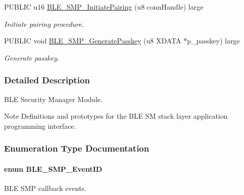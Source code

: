 \begin{DoxyCompactItemize}
P\+U\+B\+L\+IC u16 \hyperlink{group___b_l_e___s_m_p_gaaf9a81d562febbb8c849d7933a506910}{B\+L\+E\+\_\+\+S\+M\+P\+\_\+\+Initiate\+Pairing} (u8 conn\+Handle) large
\begin{DoxyCompactList}\small\item\em Initiate pairing procedure. \end{DoxyCompactList}\item 
P\+U\+B\+L\+IC void \hyperlink{group___b_l_e___s_m_p_ga12416df40c1d416bbb22aa7168a4e668}{B\+L\+E\+\_\+\+S\+M\+P\+\_\+\+Generate\+Passkey} (u8 X\+D\+A\+TA $\ast$p\+\_\+passkey) large
\begin{DoxyCompactList}\small\item\em Generate passkey. \end{DoxyCompactList}\end{DoxyCompactItemize}


\subsubsection{Detailed Description}
B\+LE Security Manager Module. 

\begin{DoxyNote}{Note}
Definitions and prototypes for the B\+LE SM stack layer application programming interface. 
\end{DoxyNote}


\subsubsection{Enumeration Type Documentation}
\paragraph[{\texorpdfstring{B\+L\+E\+\_\+\+S\+M\+P\+\_\+\+Event\+ID}{BLE_SMP_EventID}}]{\setlength{\rightskip}{0pt plus 5cm}enum {\bf B\+L\+E\+\_\+\+S\+M\+P\+\_\+\+Event\+ID}}\hypertarget{group___b_l_e___s_m_p_ga4b348bac282c69fdb7a248c83a3e55dd}{}\label{group___b_l_e___s_m_p_ga4b348bac282c69fdb7a248c83a3e55dd}


B\+LE S\+MP callback events. 

